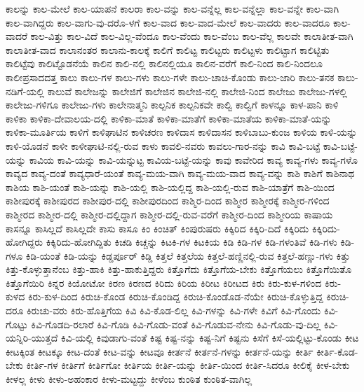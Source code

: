{ಕಾಲನ್ನು
ಕಾಲ-ಮೇಲೆ
ಕಾಲ-ಯಾಪನೆ
ಕಾಲರಾ
ಕಾಲ-ವನ್ನು
ಕಾಲ-ವನ್ನೆಲ್ಲ
ಕಾಲ-ವನ್ನೆಲ್ಲಾ
ಕಾಲ-ವನ್ನೇ
ಕಾಲ-ವಾಗಿ
ಕಾಲ-ವಾಗಿದ್ದರು
ಕಾಲ-ವಾಗು-ವು-ದರೊ-ಳಗೆ
ಕಾಲ-ವಾದ
ಕಾಲ-ವಾದ-ಮೇಲೆ
ಕಾಲ-ವಾದರು
ಕಾಲ-ವಾದರೂ
ಕಾಲ-ವಾದರೆ
ಕಾಲ-ವಿತ್ತು
ಕಾಲ-ವಿದೆ
ಕಾಲ-ವಿಲ್ಲ-ವೆಂದೂ
ಕಾಲ-ವೆಂದು
ಕಾಲ-ವೆಂಬ
ಕಾಲ-ವೆಲ್ಲ
ಕಾಲವೇ
ಕಾಲಾತೀತ-ವಾಗಿ
ಕಾಲಾತೀತ-ವಾದ
ಕಾಲಾನಂತರ
ಕಾಲಾನು-ಕಾಲಕ್ಕೆ
ಕಾಲಿಗೆ
ಕಾಲಿಟ್ಟ
ಕಾಲಿಟ್ಟರು
ಕಾಲಿಟ್ಟಳು
ಕಾಲಿಟ್ಟಾಗ
ಕಾಲಿಟ್ಟಿತು
ಕಾಲಿಟ್ಟೆವು
ಕಾಲಿಟ್ಟೊಡನೆಯೆ
ಕಾಲಿನ
ಕಾಲಿ-ನಲ್ಲಿ
ಕಾಲಿನಲ್ಲಿಯೂ
ಕಾಲಿನ-ವರೆಗೆ
ಕಾಲಿ-ನಿಂದ
ಕಾಲಿ-ನಿಂದಲೂ
ಕಾಲೀಪ್ರಸಾದದತ್ತ
ಕಾಲು
ಕಾಲು-ಗಳ
ಕಾಲು-ಗಳು
ಕಾಲು-ಗಳೇ
ಕಾಲು-ಚಾಚಿ-ಕೊಂಡು
ಕಾಲು-ಜಾರಿ
ಕಾಲು-ತನಕ
ಕಾಲು-ನಡಿಗೆ-ಯಲ್ಲಿ
ಕಾಲುವೆ
ಕಾಲೇಜನ್ನು
ಕಾಲೇಜಿಗೆ
ಕಾಲೇಜಿನ
ಕಾಲೇಜಿ-ನಲ್ಲಿ
ಕಾಲೇಜಿ-ನಿಂದ
ಕಾಲೇಜು
ಕಾಲೇಜು-ಗಳಲ್ಲಿ
ಕಾಲೇಜು-ಗಳಿಗೂ
ಕಾಲೇಜು-ಗಳು
ಕಾಲೇನಾತ್ಮನಿ
ಕಾಲ್ಪನಿಕ
ಕಾಲ್ಪನಿಕವೇ
ಕಾಲ್ವಿ
ಕಾಲ್ವಿಗೆ
ಕಾಳನ್ನೂ
ಕಾಳ-ಪಾನಿ
ಕಾಳಿ
ಕಾಳಿಕಾ
ಕಾಳಿಕಾ-ದೇವಾಲಯ-ದಲ್ಲಿ
ಕಾಳಿಕಾ-ಮಾತೆ
ಕಾಳಿಕಾ-ಮಾತೆಗೆ
ಕಾಳಿಕಾ-ಮಾತೆಯ
ಕಾಳಿಕಾ-ಮಾತೆ-ಯನ್ನು
ಕಾಳಿಕಾ-ಮೂರ್ತಿಯ
ಕಾಳಿಗೆ
ಕಾಳಿಘಾಟಿನ
ಕಾಳಿಚರಣ
ಕಾಳಿದಾಸ
ಕಾಳಿದಾಸನ
ಕಾಳಿಬಾಬು-ಕುಂಜ
ಕಾಳಿಯ
ಕಾಳಿ-ಯನ್ನು
ಕಾಳಿ-ಯೊಡನೆ
ಕಾಳೀ
ಕಾಳೀಘಾಟಿ-ನಲ್ಲಿ-ರುವ
ಕಾಳು
ಕಾವಲಿ-ನವರು
ಕಾವಲು-ಗಾರ-ನನ್ನು
ಕಾವಿ
ಕಾವಿ-ಬಟ್ಟೆ
ಕಾವಿ-ಬಟ್ಟೆ-ಯನ್ನು
ಕಾವಿಯ
ಕಾವಿ-ಯನ್ನು
ಕಾವಿ-ಯನ್ನುಟ್ಟ
ಕಾವಿಯ-ಬಟ್ಟೆ-ಯನ್ನು
ಕಾವು
ಕಾವೇರಿದ
ಕಾವ್ಯ
ಕಾವ್ಯ-ಗಳು
ಕಾವ್ಯ-ಗಳೊ
ಕಾವ್ಯದ
ಕಾವ್ಯ-ದಂತೆ
ಕಾವ್ಯಧಾರೆ-ಯಂತೆ
ಕಾವ್ಯ-ಮಯ-ವಾಗಿ
ಕಾವ್ಯ-ಮಯ-ವಾದ
ಕಾವ್ಯ-ವನ್ನು
ಕಾಶಿ
ಕಾಶಿಗೆ
ಕಾಶಿನಾಥ
ಕಾಶಿಯ
ಕಾಶಿ-ಯಂತೆ
ಕಾಶಿ-ಯನ್ನು
ಕಾಶಿ-ಯಲ್ಲಿ
ಕಾಶಿ-ಯಲ್ಲಿದ್ದ
ಕಾಶಿ-ಯಲ್ಲಿ-ರುವ
ಕಾಶಿ-ಯಾತ್ರೆಗೆ
ಕಾಶಿ-ಯಿಂದ
ಕಾಶೀಪುರಕ್ಕೆ
ಕಾಶೀಪುರದ
ಕಾಶೀಪುರ-ದಲ್ಲಿ
ಕಾಶೀಪುರದಿಂದ
ಕಾಶ್ಮಿರ-ದಿಂದ
ಕಾಶ್ಮೀರ
ಕಾಶ್ಮೀರಕ್ಕೆ
ಕಾಶ್ಮೀರ-ಗಳಿಂದ
ಕಾಶ್ಮೀರದ
ಕಾಶ್ಮೀರ-ದಲ್ಲಿ
ಕಾಶ್ಮೀರ-ದಲ್ಲಿದ್ದಾಗ
ಕಾಶ್ಮೀರ-ದಲ್ಲಿ-ರುವ-ವರೆಗೆ
ಕಾಶ್ಮೀರ-ದಿಂದ
ಕಾಶ್ಮೀರಿಯ
ಕಾಷಾಯ
ಕಾಸನ್ನೂ
ಕಾಸಿಲ್ಲದೆ
ಕಾಸಿಲ್ಲದೇ
ಕಾಸು
ಕಾಸೂ
ಕಿಂ
ಕಿಂಚಿತ್
ಕಿಂಪುರುಷರು
ಕಿಕ್ಕಿರಿದ
ಕಿಕ್ಕಿರಿ-ದಿದೆ
ಕಿಕ್ಕಿರಿದು
ಕಿಕ್ಕಿರಿದು-ಹೋಗಿದ್ದರು
ಕಿಕ್ಕಿರಿದು-ಹೋಗಿದ್ದಿತು
ಕಿಚಡಿ
ಕಿಚ್ಚನ್ನು
ಕಿಟಕಿ-ಗಳ
ಕಿಟಕಿಯ
ಕಿಡಿ
ಕಿಡಿ-ಗಳ
ಕಿಡಿ-ಗಳಂತಿವೆ
ಕಿಡಿ-ಗಳು
ಕಿಡಿ-ಗಳೂ
ಕಿಡಿ-ಯಂತೆ
ಕಿಡಿ-ಯನ್ನು
ಕಿಡ್ಡರ್ಪೂರ್
ಕಿಡ್ಡಿ
ಕಿತ್ತಲೆ
ಕಿತ್ತಲೆಯ
ಕಿತ್ತಲೆ-ಹಣ್ಣಿನಲ್ಲಿ-ರುವ
ಕಿತ್ತಲೆ-ಹಣ್ಣು-ಗಳು
ಕಿತ್ತು
ಕಿತ್ತು-ಕೊಳ್ಳುತ್ತಾನೆಂಬ
ಕಿತ್ತು-ಹಾಕಿ
ಕಿತ್ತು-ಹಾಕುತ್ತಿದ್ದರು
ಕಿತ್ತೊಗೆದು
ಕಿತ್ತೊಗೆಯ-ಬೇಕು
ಕಿತ್ತೊಗೆಯಲು
ಕಿತ್ತೊಗೆಯಿತೊ
ಕಿತ್ತೊಗೆಯಿರಿ
ಕಿನ್ನರ
ಕಿಯೋಟೋ
ಕಿರಣ
ಕಿರಣದ
ಕಿರಿದು
ಕಿರಿಯ
ಕಿರೀಟ
ಕಿರೀಟದ
ಕಿರು
ಕಿರು-ಕುಳ-ಗಳಿಂದ
ಕಿರು-ಕುಳದ
ಕಿರು-ಕುಳ-ದಿಂದ
ಕಿರುಚಿ-ಕೊಂಡ
ಕಿರುಚಿ-ಕೊಂಡಿದ್ದ
ಕಿರುಚಿ-ಕೊಂಡೊಡ-ನೆಯೇ
ಕಿರುಚಿ-ಕೊಳ್ಳುತ್ತಿದ್ದ
ಕಿರುಚಿ-ದರೂ
ಕಿರುಚು-ವರು
ಕಿರು-ಹೊತ್ತಿಗೆಯ
ಕಿವಿ
ಕಿವಿ-ಕೊಡ-ಲಿಲ್ಲ
ಕಿವಿ-ಗಳನ್ನು
ಕಿವಿ-ಗಳೇ
ಕಿವಿಗೆ
ಕಿವಿ-ಗೊಂದು
ಕಿವಿ-ಗೊಟ್ಟು
ಕಿವಿ-ಗೊಡದಿ-ರಲಾರೆ
ಕಿವಿ-ಗೊಡಿ
ಕಿವಿ-ಗೊಡು-ವಂತೆ
ಕಿವಿ-ಗೊಡುವ-ನೇನು
ಕಿವಿ-ಗೊಡು-ವು-ದಿಲ್ಲ
ಕಿವಿ-ಯನ್ನಿರಿ-ಯುತ್ತದೆ
ಕಿವಿ-ಯಲ್ಲಿ
ಕಿವುಡಾಗು-ವಂತೆ
ಕಿಷ್ಟ
ಕಿಷ್ಟ-ನನ್ನು
ಕಿಷ್ಟ-ನಿಗೆ
ಕಿಷ್ಟನು
ಕಿಸೆಗೆ
ಕಿಸೆ-ಯಲ್ಲಿಟ್ಟು-ಕೊಂಡು
ಕೀಟ
ಕೀಟಕ್ಕಿಂತ
ಕೀಟಕ್ಕೂ
ಕೀಟ-ದಂತೆ
ಕೀಟ-ವನ್ನು
ಕೀಟವೂ
ಕೀರ್ತನೆ
ಕೀರ್ತನೆ-ಗಳನ್ನು
ಕೀರ್ತನೆ-ಯನ್ನು
ಕೀರ್ತಿ
ಕೀರ್ತಿ-ಕೊಡ-ಬೇಕು
ಕೀರ್ತಿ-ಗಳ
ಕೀರ್ತಿಗೆ
ಕೀರ್ತಿಗೋ
ಕೀರ್ತಿಯ
ಕೀರ್ತಿ-ಯನ್ನು
ಕೀರ್ತಿ-ಯಿಂದ
ಕೀರ್ತಿ-ಸಿದರೂ
ಕೀಲಿಕೈ
ಕೀಳ-ಬೇಕು
ಕೀಳಲ್ಲ
ಕೀಳು
ಕೀಳು-ಅಹಂಕಾರ
ಕೀಳು-ಮಟ್ಟದ್ದು
ಕೀಳೆಂಬ
ಕುಂಠಿತ
ಕುಂಠಿತ-ವಾಗಿಲ್ಲ
}
